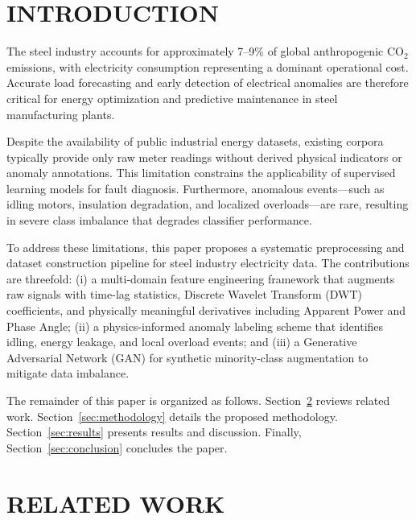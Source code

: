 \documentclass[conference]{IEEEtran}
\begin{document}
\section{INTRODUCTION}
\label{sec:introduction}

The steel industry accounts for approximately 7--9\% of global 
anthropogenic CO$_2$ emissions, with electricity consumption 
representing a dominant operational cost. Accurate load 
forecasting and early detection of electrical anomalies are 
therefore critical for energy optimization and predictive 
maintenance in steel manufacturing plants.

Despite the availability of public industrial energy datasets, 
existing corpora typically provide only raw meter readings 
without derived physical indicators or anomaly annotations. 
This limitation constrains the applicability of supervised 
learning models for fault diagnosis. Furthermore, anomalous 
events---such as idling motors, insulation degradation, and 
localized overloads---are rare, resulting in severe class 
imbalance that degrades classifier performance.

To address these limitations, this paper proposes a systematic 
preprocessing and dataset construction pipeline for steel 
industry electricity data. The contributions are threefold: 
(i) a multi-domain feature engineering framework that augments 
raw signals with time-lag statistics, Discrete Wavelet Transform 
(DWT) coefficients, and physically meaningful derivatives 
including Apparent Power and Phase Angle; (ii) a 
physics-informed anomaly labeling scheme that identifies 
idling, energy leakage, and local overload events; and (iii) 
a Generative Adversarial Network (GAN) for synthetic 
minority-class augmentation to mitigate data imbalance.

The remainder of this paper is organized as follows. 
Section~\ref{sec:related} reviews related work. 
Section~\ref{sec:methodology} details the proposed methodology. 
Section~\ref{sec:results} presents results and discussion. 
Finally, Section~\ref{sec:conclusion} concludes the paper.

\section{RELATED WORK}
\label{sec:related}
\end{document}
